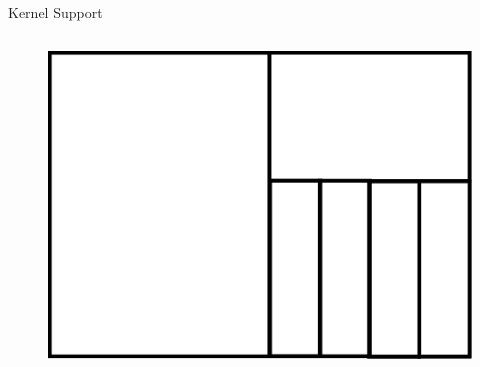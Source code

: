 \begin{frame}{Kernel Support}
\begin{columns}[T]
\begin{column}{.5\textwidth}
			\begin{figure}[hb]
				\centering
				\includegraphics[scale=0.2]{img/cgroups.png}
			\end{figure}
		\end{column}
	\end{columns}
\end{frame}